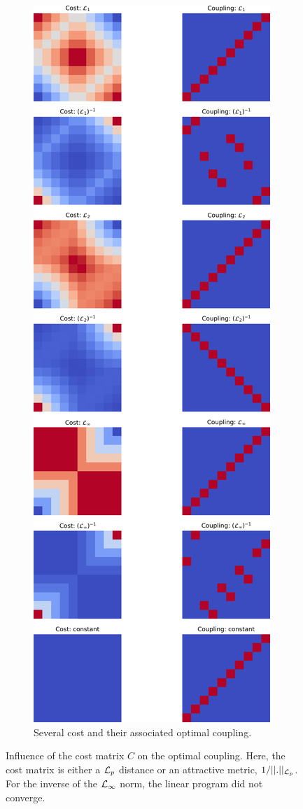 \begin{figure}[p]
\begin{subfigure}[c]{0.5\textwidth}
        \includegraphics[width=\linewidth]{samples/1/all_couplings.png}
        \caption{Several cost and their associated optimal coupling.}
    \end{subfigure}
    \caption{Influence of the cost matrix $C$ on the optimal coupling. Here, the cost matrix is either a $\mathcal{L}_p$ distance or an attractive metric, $1/||. ||_{\mathcal{L}_p}$. For the inverse of the $\mathcal{L}_{\infty}$ norm, the linear program did not converge.}
    \label{fig:comparaison_of_distances}
\end{figure}

